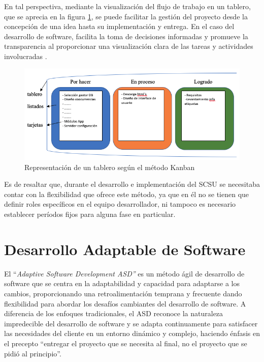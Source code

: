 \documentclass[
  12pt,
  openany]{book}
\begin{document}
En tal perspectiva, mediante la visualización del flujo de trabajo en un tablero, que se aprecia en la figura \ref{fig:metkanban}, se puede facilitar la gestión del proyecto desde la concepción de una idea hasta su implementación y entrega. En el caso del desarrollo de software, facilita la toma de decisiones informadas y promueve la transparencia al proporcionar una visualización clara de las tareas y actividades involucradas \citep{stephens2015}.

\begin{figure}

{\centering \includegraphics[width=0.7\linewidth]{images/04-metodologia/01_kanban} 

}

\caption{Representación de un tablero según el método Kanban}\label{fig:metkanban}
\end{figure}

Es de resaltar que, durante el desarrollo e implementación del SCSU se necesitaba contar con la flexibilidad que ofrece este método, ya que en él no se tienen que definir roles específicos en el equipo desarrollador, ni tampoco es necesario establecer períodos fijos para alguna fase en particular.

\hypertarget{mmasd}{%
\section{Desarrollo Adaptable de Software}\label{mmasd}}



El ``\emph{Adaptive Software Development ASD''} \citep{highsmith2000} es un método ágil de desarrollo de software que se centra en la adaptabilidad y capacidad para adaptarse a los cambios, proporcionando una retroalimentación temprana y frecuente dando flexibilidad para abordar los desafíos cambiantes del desarrollo de software. A diferencia de los enfoques tradicionales, el ASD reconoce la naturaleza impredecible del desarrollo de software y se adapta continuamente para satisfacer las necesidades del cliente en un entorno dinámico y complejo, haciendo énfasis en el precepto ``entregar el proyecto que se necesita al final, no el proyecto que se pidió al principio''.
\end{document}

